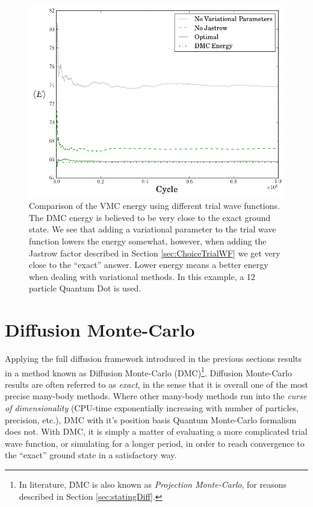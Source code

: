 \begin{figure}
 \begin{center}
  \includegraphics[scale=0.65]{../Graphics/WFComp.png}
  \caption{Comparison of the VMC energy using different trial wave functions. The DMC energy is believed to be very close to the exact ground state. We see that adding a variational parameter to the trial wave function lowers the energy somewhat, however, when adding the Jastrow factor described in Section \ref{sec:ChoiceTrialWF} we get very close to the ``exact'' answer. Lower energy means a better energy when dealing with variational methods. In this example, a 12 particle Quantum Dot is used.}
  \label{fig:VMC_wfcomp}
 \end{center}
\end{figure}

\section{Diffusion Monte-Carlo}
\label{sec:DMC}

Applying the full diffusion framework introduced in the previous sections results in a method known as Diffusion Monte-Carlo (DMC)\footnote{In literature, DMC is also known as \textit{Projection Monte-Carlo}, for reasons described in Section \ref{sec:statingDiff}.}. Diffusion Monte-Carlo results are often referred to as \textit{exact}, in the sense that it is overall one of the most precise many-body methods. Where other many-body methods run into the \textit{curse of dimensionality} (CPU-time exponentially increasing with number of particles, precision, etc.), DMC with it's position basis Quantum Monte-Carlo formalism does not. With DMC, it is simply a matter of evaluating a more complicated trial wave function, or simulating for a longer period, in order to reach convergence to the ``exact'' ground state in a satisfactory way.

